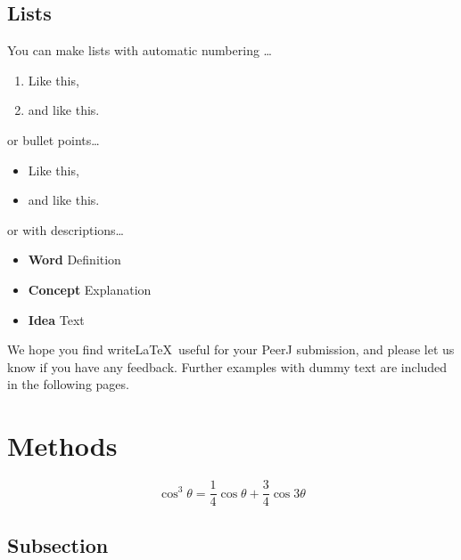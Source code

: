 \documentclass[fleqn,10pt,lineno]{wlpeerj} %
\providecommand{\tightlist}{
\setlength{\itemsep}{0pt}\setlength{\parskip}{0pt}}
\theoremstyle{definition}
\theoremstyle{definition}
\theoremstyle{definition}
\theoremstyle{remark}
\begin{document}
\subsection*{Lists}\label{lists}

You can make lists with automatic numbering \dots

\begin{enumerate}
\def\labelenumi{\arabic{enumi}.}
\tightlist
\item
  Like this,
\item
  and like this.
\end{enumerate}

or bullet points\ldots{}

\begin{itemize}
\tightlist
\item
  Like this,
\item
  and like this.
\end{itemize}

or with descriptions\ldots{}

\begin{itemize}
\tightlist
\item
  \textbf{Word} Definition
\item
  \textbf{Concept} Explanation
\item
  \textbf{Idea} Text
\end{itemize}

We hope you find write\LaTeX~useful for your PeerJ submission, and
please let us know if you have any feedback. Further examples with dummy
text are included in the following pages.

\section*{Methods}\label{methods-1}

\lipsum[4] 

\begin{equation}
\cos^3 \theta =\frac{1}{4}\cos\theta+\frac{3}{4}\cos 3\theta
\label{eq:refname2}
\end{equation}

\lipsum[5] 

\subsection*{Subsection}\label{subsection}
\end{document}
